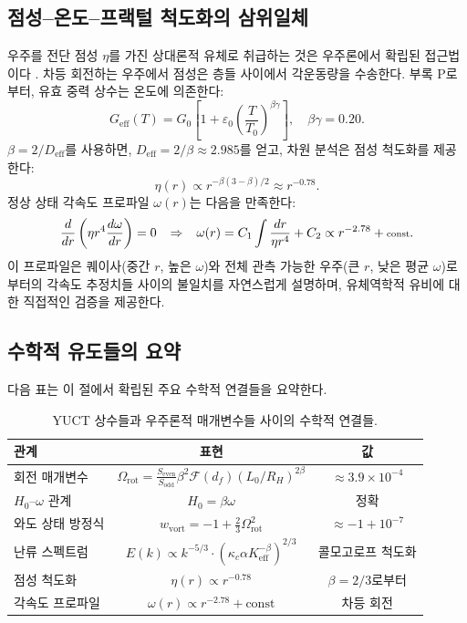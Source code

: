 \documentclass[11pt,a4paper]{article}
\begin{document}
	\subsection{점성–온도–프랙털 척도화의 삼위일체}
	
	우주를 전단 점성 \(\eta\)를 가진 상대론적 유체로 취급하는 것은 우주론에서 확립된 접근법이다 \cite{Giovannini2005}. 차등 회전하는 우주에서 점성은 층들 사이에서 각운동량을 수송한다. 부록 P로부터, 유효 중력 상수는 온도에 의존한다:
	\begin{equation}
		G_{\mathrm{eff}}(T) = G_0\left[1 + \varepsilon_0\left(\frac{T}{T_0}\right)^{\beta\gamma}\right], \quad \beta\gamma = 0.20.
	\end{equation}
	\(\beta = 2/D_{\mathrm{eff}}\)를 사용하면, \(D_{\mathrm{eff}} = 2/\beta \approx 2.985\)를 얻고, 차원 분석은 점성 척도화를 제공한다:
	\begin{equation}
		\eta(r) \propto r^{-\beta(3-\beta)/2} \approx r^{-0.78}.
	\end{equation}
	정상 상태 각속도 프로파일 \(\omega(r)\)는 다음을 만족한다:
	\begin{equation}
		\scriptsize
		\frac{d}{dr}\left( \eta r^4 \frac{d\omega}{dr} \right) = 0 \quad \Rightarrow \quad \omega(r) = C_1 \int \frac{dr}{\eta r^4} + C_2 \propto r^{-2.78} + \text{const}.
	\end{equation}
	이 프로파일은 퀘이사(중간 \(r\), 높은 \(\omega\))와 전체 관측 가능한 우주(큰 \(r\), 낮은 평균 \(\omega\))로부터의 각속도 추정치들 사이의 불일치를 자연스럽게 설명하며, 유체역학적 유비에 대한 직접적인 검증을 제공한다.
	
	\subsection{수학적 유도들의 요약}
	
	다음 표는 이 절에서 확립된 주요 수학적 연결들을 요약한다.
	
	\begin{table}[htbp]
		\centering
		\caption{YUCT 상수들과 우주론적 매개변수들 사이의 수학적 연결들.}
		\label{tab:math-connections}
		\begin{tabular}{l c c}
			\toprule
			\textbf{관계} & \textbf{표현} & \textbf{값} \\
			\midrule
			회전 매개변수 & \(\Omega_{\mathrm{rot}} = \frac{S_{\mathrm{even}}}{S_{\mathrm{odd}}} \beta^2 \mathcal{F}(d_f) (L_0/R_H)^{2\beta}\) & \(\approx 3.9 \times 10^{-4}\) \\
			\(H_0\)–\(\omega\) 관계 & \(H_0 = \beta \omega\) & 정확 \\
			와도 상태 방정식 & \(w_{\mathrm{vort}} = -1 + \frac{2}{3}\Omega_{\mathrm{rot}}^2\) & \(\approx -1 + 10^{-7}\) \\
			난류 스펙트럼 & \(E(k) \propto k^{-5/3} \cdot (\kappa_c \alpha K_{\mathrm{eff}}^{-\beta})^{2/3}\) & 콜모고로프 척도화 \\
			점성 척도화 & \(\eta(r) \propto r^{-0.78}\) & \(\beta = 2/3\)로부터 \\
			각속도 프로파일 & \(\omega(r) \propto r^{-2.78} + \text{const}\) & 차등 회전 \\
			\bottomrule
		\end{tabular}
	\end{table}
	
\end{document}
